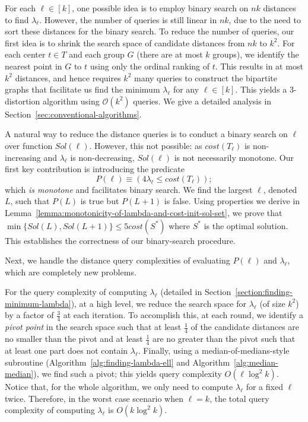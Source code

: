 \documentclass{article}
\newcommand{\bigO}{\ensuremath{\mathcal{O}}\xspace}
\begin{document}
For each $\ell \in [k]$, one possible idea is to employ binary search on $nk$ distances to find $\lambda_{\ell}$. However, the number of queries is still linear in $nk$, due to the need to sort these distances for the binary search.
To reduce the number of queries, our first idea is to shrink the search space of candidate distances from $nk$ to $k^2$. For each center $t \in T$ and each group $G$ (there are at most $k$ groups), we identify the nearest point in $G$ to $t$ using only the ordinal ranking of $t$. 
This results in at most $k^2$ distances, and hence requires $k^2$ many queries to construct the bipartite graphs that facilitate us find the minimum $\lambda_{\ell}$ for any $\ell \in [k]$.
This yields a $3$-distortion algorithm using $\bigO(k^2)$ queries.
We give a detailed analysis in Section~\ref{sec:conventional-algorithms}. 



A natural way to reduce the distance queries is to conduct a binary search on $\ell$ over function $Sol(\ell)$. However, this not possible:  as $cost(T_{\ell})$ is non-increasing and $\lambda_{\ell}$ is non-decreasing, $Sol(\ell)$ is not necessarily monotone. 
Our first key contribution is introducing the predicate $$P(\ell) \equiv (4 \lambda_{\ell} \leq cost(T_{\ell}));$$
which \emph{is monotone} and facilitates binary search. We find the largest $\ell$, denoted $L$, such that $P(L)$ is true but $P(L+1)$ is false. 
Using properties we derive in Lemma~\ref{lemma:monotonicity-of-lambda-and-cost-init-sol-set}, we prove that $\min\{Sol(L), Sol(L+1)\} \leq 5 cost(S^*)$ where $S^*$ is the optimal solution. This establishes the correctness of our binary-search procedure. 

Next, we handle the distance query complexities of evaluating $P(\ell)$ and $\lambda_{\ell}$, which are completely new problems. 

For the query complexity of computing $\lambda_{\ell}$ (detailed in Section~\ref{section:finding-minimum-lambda}), at a high level, we reduce the search space for $\lambda_{\ell}$ (of size $k^2$) by a factor of $\frac{3}{4}$ at each iteration. To accomplish this, at each round, we identify a \emph{pivot point} in the search space such that at least $\frac{1}{4}$ of the candidate distances are no smaller than the pivot and at least $\frac{1}{4}$ are no greater than the pivot such that at least one part does not contain $\lambda_\ell$. Finally, using a median-of-medians-style subroutine (Algorithm~\ref{alg:finding-lambda-ell} and Algorithm~\ref{alg:median-median}), we find such a pivot; this yields query complexity $O(\ell \log^{2} k)$.
Notice that, for the whole algorithm, we only need to compute $\lambda_{\ell}$ for a fixed $\ell$ twice. Therefore, in the worst case scenario when $\ell = k$, the total query complexity of computing $\lambda_{\ell}$ is $O(k \log^2 k)$.
\end{document}
